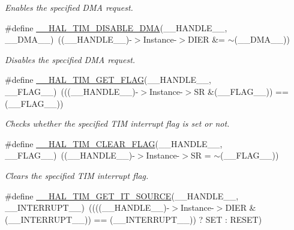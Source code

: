 \begin{DoxyCompactItemize}
\begin{DoxyCompactList}\small\item\em Enables the specified D\+MA request. \end{DoxyCompactList}\item 
\#define \hyperlink{group___t_i_m___exported___macros_ga1a6e8b19efd23fd0295802d904c4702f}{\+\_\+\+\_\+\+H\+A\+L\+\_\+\+T\+I\+M\+\_\+\+D\+I\+S\+A\+B\+L\+E\+\_\+\+D\+MA}(\+\_\+\+\_\+\+H\+A\+N\+D\+L\+E\+\_\+\+\_\+,  \+\_\+\+\_\+\+D\+M\+A\+\_\+\+\_\+)~((\+\_\+\+\_\+\+H\+A\+N\+D\+L\+E\+\_\+\+\_\+)-\/$>$Instance-\/$>$D\+I\+ER \&= $\sim$(\+\_\+\+\_\+\+D\+M\+A\+\_\+\+\_\+))
\begin{DoxyCompactList}\small\item\em Disables the specified D\+MA request. \end{DoxyCompactList}\item 
\#define \hyperlink{group___t_i_m___exported___macros_ga96d98c66ad9d85f00c148de99888ef19}{\+\_\+\+\_\+\+H\+A\+L\+\_\+\+T\+I\+M\+\_\+\+G\+E\+T\+\_\+\+F\+L\+AG}(\+\_\+\+\_\+\+H\+A\+N\+D\+L\+E\+\_\+\+\_\+,  \+\_\+\+\_\+\+F\+L\+A\+G\+\_\+\+\_\+)~(((\+\_\+\+\_\+\+H\+A\+N\+D\+L\+E\+\_\+\+\_\+)-\/$>$Instance-\/$>$SR \&(\+\_\+\+\_\+\+F\+L\+A\+G\+\_\+\+\_\+)) == (\+\_\+\+\_\+\+F\+L\+A\+G\+\_\+\+\_\+))
\begin{DoxyCompactList}\small\item\em Checks whether the specified T\+IM interrupt flag is set or not. \end{DoxyCompactList}\item 
\#define \hyperlink{group___t_i_m___exported___macros_ga2fe74db6b8cb4badd04ed48e0f5ac7b4}{\+\_\+\+\_\+\+H\+A\+L\+\_\+\+T\+I\+M\+\_\+\+C\+L\+E\+A\+R\+\_\+\+F\+L\+AG}(\+\_\+\+\_\+\+H\+A\+N\+D\+L\+E\+\_\+\+\_\+,  \+\_\+\+\_\+\+F\+L\+A\+G\+\_\+\+\_\+)~((\+\_\+\+\_\+\+H\+A\+N\+D\+L\+E\+\_\+\+\_\+)-\/$>$Instance-\/$>$SR = $\sim$(\+\_\+\+\_\+\+F\+L\+A\+G\+\_\+\+\_\+))
\begin{DoxyCompactList}\small\item\em Clears the specified T\+IM interrupt flag. \end{DoxyCompactList}\item 
\#define \hyperlink{group___t_i_m___exported___macros_ga644babf93470a6eee6bce8906c4da5c5}{\+\_\+\+\_\+\+H\+A\+L\+\_\+\+T\+I\+M\+\_\+\+G\+E\+T\+\_\+\+I\+T\+\_\+\+S\+O\+U\+R\+CE}(\+\_\+\+\_\+\+H\+A\+N\+D\+L\+E\+\_\+\+\_\+,  \+\_\+\+\_\+\+I\+N\+T\+E\+R\+R\+U\+P\+T\+\_\+\+\_\+)~((((\+\_\+\+\_\+\+H\+A\+N\+D\+L\+E\+\_\+\+\_\+)-\/$>$Instance-\/$>$D\+I\+ER \& (\+\_\+\+\_\+\+I\+N\+T\+E\+R\+R\+U\+P\+T\+\_\+\+\_\+)) == (\+\_\+\+\_\+\+I\+N\+T\+E\+R\+R\+U\+P\+T\+\_\+\+\_\+)) ? S\+ET \+: R\+E\+S\+ET)

\end{DoxyCompactItemize}
